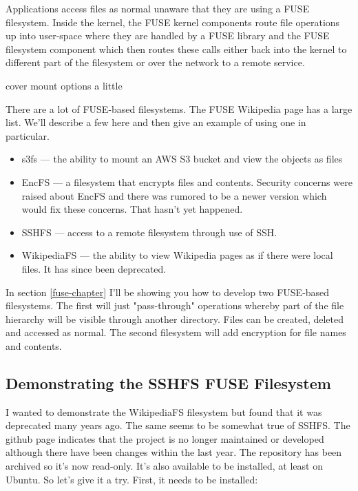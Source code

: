 Applications access files as normal unaware that they are using a FUSE filesystem. Inside the kernel, the FUSE kernel components route file operations up into user-space where they are handled by a FUSE library and the FUSE filesystem component which then routes these calls either back into the kernel to different part of the filesystem or over the network to a remote service. 

cover mount options a little

There are a lot of FUSE-based filesystems. The FUSE Wikipedia page has a large list. We'll describe a few here and then give an example of using one in particular.

\begin{itemize}
	\item s3fs --- the ability to mount an AWS S3 bucket and view the objects as files
	\item EncFS --- a filesystem that encrypts files and contents. Security concerns were raised about
		EncFS and there was rumored to be a newer version which would fix these concerns. That hasn't
		yet happened.
	\item SSHFS --- access to a remote filesystem through use of SSH.
	\item WikipediaFS --- the ability to view Wikipedia pages as if there were local files. It has since
		been deprecated.
\end{itemize}

In section \ref{fuse-chapter} I'll be showing you how to develop two FUSE-based filesystems. The first will just "pass-through" operations whereby part of the file hierarchy will be visible through another directory. Files can be created, deleted and accessed as normal. The second filesystem will add encryption for file names and contents.


\subsection{Demonstrating the SSHFS FUSE Filesystem}\label{ssh-fuse}

I wanted to demonstrate the WikipediaFS filesystem but found that it was deprecated many years ago. The same seems to be somewhat true of SSHFS. The github page indicates that the project is no longer maintained or developed although there have been changes within the last year. The repository has been archived so it's now read-only. It's also available to be installed, at least on Ubuntu. So let's give it a try. First, it needs to be installed:

